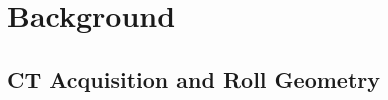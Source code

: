 \chapter{Background}
\label{chap:background}

\section{CT Acquisition and Roll Geometry}
\label{sec:ct-acquisition}
